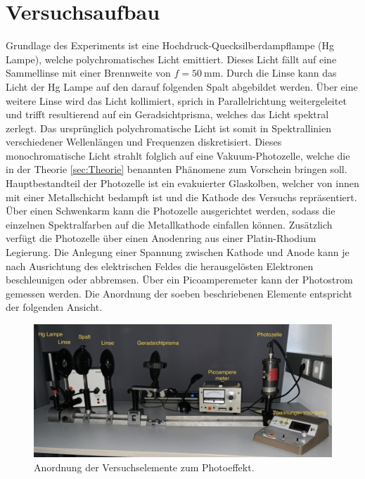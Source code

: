 



\section{Versuchsaufbau}
\label{sec:Versuchsaufbau}

Grundlage des Experiments ist eine Hochdruck-Quecksilberdampflampe (Hg Lampe), welche polychromatisches Licht emittiert. Dieses Licht fällt auf eine
Sammellinse mit einer Brennweite von $f = \qty{50}{\milli\meter}$. Durch die Linse kann das Licht der Hg Lampe auf den darauf folgenden Spalt abgebildet 
werden. Über eine weitere Linse wird das Licht kollimiert, sprich in Parallelrichtung weitergeleitet und trifft resultierend auf ein Geradsichtprisma, 
welches das Licht spektral zerlegt. Das ursprünglich polychromatische Licht ist somit in Spektrallinien verschiedener Wellenlängen und Frequenzen 
diskretisiert. Dieses monochromatische Licht strahlt folglich auf eine Vakuum-Photozelle, welche die in der Theorie \ref{sec:Theorie} benannten 
Phänomene zum Vorschein bringen soll. Hauptbestandteil der Photozelle ist ein evakuierter Glaskolben, welcher von innen mit einer Metallschicht bedampft
ist und die Kathode des Versuchs repräsentiert. Über einen Schwenkarm kann die Photozelle ausgerichtet werden, sodass die einzelnen Spektralfarben auf die 
Metallkathode einfallen können. Zusätzlich verfügt die Photozelle über einen Anodenring aus einer Platin-Rhodium Legierung. Die Anlegung
einer Spannung zwischen Kathode und Anode kann je nach Ausrichtung des elektrischen Feldes die herausgelösten Elektronen beschleunigen oder abbremsen. 
Über ein Picoamperemeter kann der Photostrom gemessen werden. Die Anordnung der soeben beschriebenen Elemente entspricht der folgenden Ansicht.\\

\begin{figure}
    \centering
    \includegraphics[height=5cm]{Anordnung.png}
    \caption{Anordnung der Versuchselemente zum Photoeffekt\cite{Versuchsanleitung_v500}.}
    \label{fig:Anordnung}
\end{figure}


